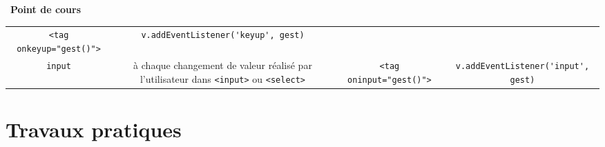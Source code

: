 \documentclass[
  11pt,
]{article}
\newcommand{\passthrough}[1]{#1}
\newcounter{cours}
\newenvironment{cours}[1]
{\par \medskip   \addtocounter{cours}{1} \noindent  
\begin{bclogo}[arrondi =0.1,  ombre = true, barre=none, logo=\bcbook, marge=4]{~\textbf{Point de cours} \textbf{\thecours} {\itshape #1} }  \par}
{
\end{bclogo}
 \par \bigskip }
\begin{document}
\begin{cours}{}
\begin{longtable}[]{@{}cccc@{}}
\begin{minipage}[t]{0.22\columnwidth}
\passthrough{\lstinline!<tag   onkeyup="gest()">!}\strut
\end{minipage} & \begin{minipage}[t]{0.22\columnwidth}\centering
\passthrough{\lstinline!v.addEventListener('keyup', gest)!}\strut
\end{minipage}\tabularnewline
\begin{minipage}[t]{0.22\columnwidth}\centering
\passthrough{\lstinline!input!}\strut
\end{minipage} & \begin{minipage}[t]{0.22\columnwidth}\centering
à chaque changement de valeur réalisé par l'utilisateur dans
\passthrough{\lstinline!<input>!} ou
\passthrough{\lstinline!<select>!}\strut
\end{minipage} & \begin{minipage}[t]{0.22\columnwidth}\centering
\passthrough{\lstinline!<tag      oninput="gest()">!}\strut
\end{minipage} & \begin{minipage}[t]{0.22\columnwidth}\centering
\passthrough{\lstinline!v.addEventListener('input', gest)!}\strut
\end{minipage}\tabularnewline
\bottomrule
\end{longtable}

\end{cours}

\hypertarget{travaux-pratiques}{%
\section{Travaux pratiques}\label{travaux-pratiques}}
\end{document}
